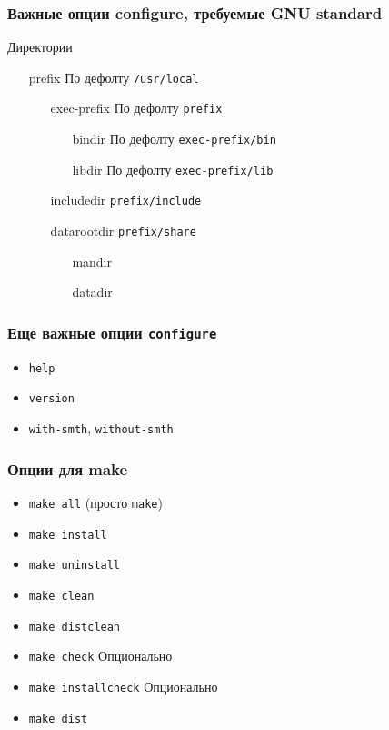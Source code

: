 \begin{frame}
 \frametitle{Важные опции configure, требуемые GNU standard}
   Директории
    \begin{enumerate}
     \item[prefix] По дефолту \texttt{/usr/local}
      \begin{enumerate}
         \item[exec-prefix] По дефолту \texttt{prefix}
         \begin{enumerate}
            \item[bindir] По дефолту \texttt{exec-prefix/bin}
            \item[libdir] По дефолту \texttt{exec-prefix/lib}
         \end{enumerate}
         \item[includedir] \texttt{prefix/include}
         \item[datarootdir] \texttt{prefix/share}
         \begin{enumerate}
            \item[mandir]
            \item[datadir]
         \end{enumerate}
      \end{enumerate}
    \end{enumerate}

\end{frame}

\begin{frame}
 \frametitle{Еще важные опции \texttt{configure}}
 \begin{itemize}
   \item \texttt{help}
   \item \texttt{version}
   \item \texttt{with-smth}, \texttt{without-smth}
  \end{itemize}
\end{frame}


\begin{frame}
  \frametitle{Опции для make}
  \begin{itemize}
    \item \texttt{make all} (просто \texttt{make})
    \item \texttt{make install}
    \item \texttt{make uninstall}
    \item \texttt{make clean}
    \item \texttt{make distclean}
    \item \texttt{make check} Опционально
    \item \texttt{make installcheck} Опционально
    \item \texttt{make dist}
  \end{itemize}
\end{frame}

